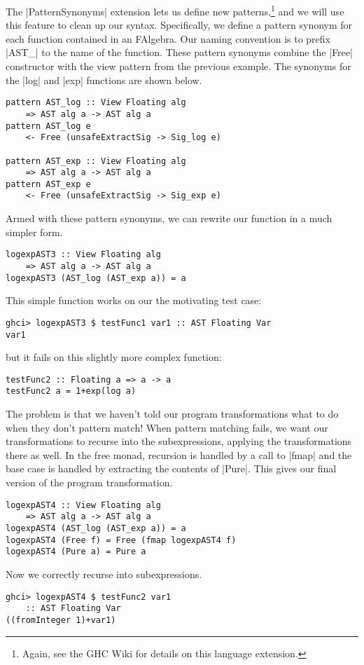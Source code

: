 \documentclass[preprint]{sigplanconf}
\theoremstyle{definition}
\begin{document}
The |PatternSynonyms| extension lets us define new patterns,\footnote{
    Again, see the GHC Wiki \cite{patternsynonyms} for details on this language extension.
}
and we will use this feature to clean up our syntax.
Specifically, we define a pattern synonym for each function contained in an FAlgebra.
Our naming convention is to prefix |AST_| to the name of the function.
These pattern synonyms combine the |Free| constructor with the view pattern from the previous example.
The synonyms for the |log| and |exp| functions are shown below.
\begin{lstlisting}
pattern AST_log :: View Floating alg
    => AST alg a -> AST alg a
pattern AST_log e
    <- Free (unsafeExtractSig -> Sig_log e)

pattern AST_exp :: View Floating alg
    => AST alg a -> AST alg a
pattern AST_exp e
    <- Free (unsafeExtractSig -> Sig_exp e)
\end{lstlisting}
Armed with these pattern synonyms,
we can rewrite our function in a much simpler form.
\begin{lstlisting}
logexpAST3 :: View Floating alg
    => AST alg a -> AST alg a
logexpAST3 (AST_log (AST_exp a)) = a
\end{lstlisting}
This simple function works on our the motivating test case:
\begin{lstlisting}
ghci> logexpAST3 $ testFunc1 var1 :: AST Floating Var
var1
\end{lstlisting}
but it fails on this slightly more complex function:
\begin{lstlisting}
testFunc2 :: Floating a => a -> a
testFunc2 a = 1+exp(log a)
\end{lstlisting}
The problem is that we haven't told our program transformations what to do when they don't pattern match!
When pattern matching fails, we want our transformations to recurse into the subexpressions,
applying the transformations there as well.
In the free monad, recursion is handled by a call to |fmap| and the base case is handled by extracting the contents of |Pure|.
This gives our final version of the program transformation.
\begin{lstlisting}
logexpAST4 :: View Floating alg
    => AST alg a -> AST alg a
logexpAST4 (AST_log (AST_exp a)) = a
logexpAST4 (Free f) = Free (fmap logexpAST4 f)
logexpAST4 (Pure a) = Pure a
\end{lstlisting}
Now we correctly recurse into subexpressions.
\begin{lstlisting}
ghci> logexpAST4 $ testFunc2 var1
    :: AST Floating Var
((fromInteger 1)+var1)
\end{lstlisting}
\end{document}
